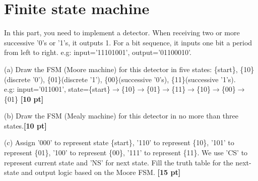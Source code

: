 \documentclass[a4paper]{article}
\begin{document}
\newpage
\section{Finite state machine}
In this part, you need to implement a detector. When receiving two or more successive '0's or '1's, it outputs 1. For a bit sequence, it inputs one bit a period from left to right. e.g: input='11101001', output='01100010'.

(a) Draw the FSM (Moore machine) for this detector in five states: \{start\}, \{10\}(discrete '0'), \{01\}(discrete '1'), \{00\}(successive '0's), \{11\}(successive '1's). \\
e.g: input='011001', state=\{start\}$\xrightarrow{}$\{10\}$\xrightarrow{}$\{01\}$\xrightarrow{}$\{11\}$\xrightarrow{}$\{10\}$\xrightarrow{}$\{00\}$\xrightarrow{}$\{01\} \textbf{[10 pt]}

(b) Draw the FSM (Mealy machine) for this detector in no more than three states.\textbf{[10 pt]}

(c) Assign '000' to represent state \{start\}, '110' to represent \{10\}, '101' to represent \{01\}, '100' to represent \{00\}, '111' to represent \{11\}. We use 'CS' to represent current state and 'NS' for next state. Fill the truth table for the next-state and output logic based on the Moore FSM. \textbf{[15 pt]}
\end{document}
